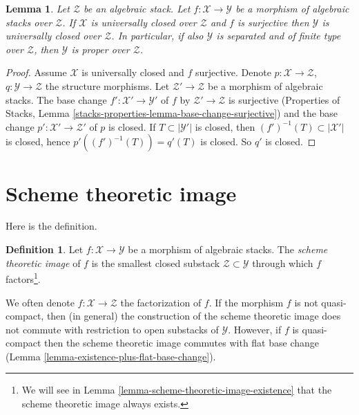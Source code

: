 \documentclass{stacks-project}
\theoremstyle{plain}
\newtheorem{lemma}[subsection]{Lemma}
\theoremstyle{definition}
\newtheorem{definition}[subsection]{Definition}
\theoremstyle{remark}
\numberwithin{equation}{subsection}
\begin{document}
\begin{lemma}
\label{lemma-image-proper-is-proper}
Let $\mathcal{Z}$ be an algebraic stack.
Let $f : \mathcal{X} \to \mathcal{Y}$
be a morphism of algebraic stacks over $\mathcal{Z}$.
If $\mathcal{X}$ is universally closed over $\mathcal{Z}$
and $f$ is surjective then $\mathcal{Y}$
is universally closed over $\mathcal{Z}$.
In particular, if also $\mathcal{Y}$ is
separated and of finite type over $\mathcal{Z}$,
then $\mathcal{Y}$ is proper over $\mathcal{Z}$.
\end{lemma}

\begin{proof}
Assume $\mathcal{X}$ is universally closed and $f$ surjective.
Denote $p : \mathcal{X} \to \mathcal{Z}$,
$q : \mathcal{Y} \to \mathcal{Z}$ the structure morphisms.
Let $\mathcal{Z}' \to \mathcal{Z}$ be a morphism of algebraic stacks.
The base change $f' : \mathcal{X}' \to \mathcal{Y}'$
of $f$ by $\mathcal{Z}' \to \mathcal{Z}$ is surjective
(Properties of Stacks, Lemma
\ref{stacks-properties-lemma-base-change-surjective}) and the base
change $p' : \mathcal{X}' \to \mathcal{Z}'$ of $p$ is closed.
If $T \subset |\mathcal{Y}'|$ is closed, then
$(f')^{-1}(T) \subset |\mathcal{X}'|$ is closed, hence
$p'((f')^{-1}(T)) = q'(T)$ is closed. So $q'$ is closed.
\end{proof}








\section{Scheme theoretic image}
\label{section-scheme-theoretic-image}

\noindent
Here is the definition.

\begin{definition}
\label{definition-scheme-theoretic-image}
Let $f : \mathcal{X} \to \mathcal{Y}$ be a morphism of algebraic stacks.
The {\it scheme theoretic image} of $f$ is the smallest closed substack
$\mathcal{Z} \subset \mathcal{Y}$ through which $f$
factors\footnote{We will see in
Lemma \ref{lemma-scheme-theoretic-image-existence}
that the scheme theoretic image always exists.}.
\end{definition}

\noindent
We often denote $f : \mathcal{X} \to \mathcal{Z}$ the factorization of $f$.
If the morphism $f$ is not quasi-compact, then (in general) the
construction of the scheme theoretic image does not commute with
restriction to open substacks of $\mathcal{Y}$. However, if $f$ is
quasi-compact then the scheme theoretic image commutes with flat base change
(Lemma \ref{lemma-existence-plus-flat-base-change}).
\end{document}
